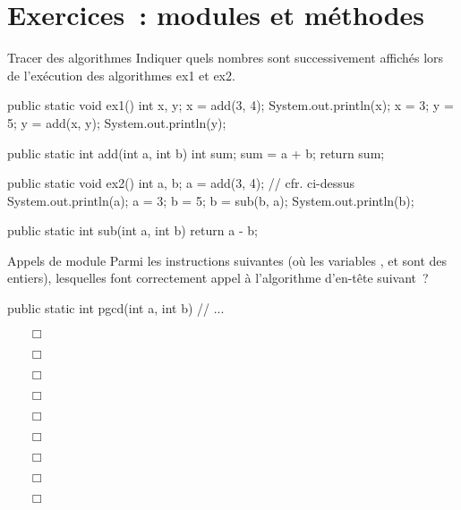 \clearpage
\section{Exercices~: modules et méthodes}

		\begin{Exercice}{Tracer des algorithmes}
			Indiquer quels nombres sont successivement affichés 
			lors de l’exécution des algorithmes ex1 et ex2.

			\begin{java}
public static void ex1(){
	int x, y;
	x = add(3, 4);
	System.out.println(x);
	x = 3;
	y = 5;
	y = add(x, y);
	System.out.println(y);
}

public static int add(int a, int b){
	int sum;
	sum = a + b;
	return sum;
}
			\end{java}

			\begin{java}
public static void ex2(){
	int a, b;
	a = add(3, 4);		// cfr. ci-dessus
	System.out.println(a);
	a = 3;
	b = 5;
	b = sub(b, a);
	System.out.println(b);
}

public static int sub(int a, int b){
	return a - b;
}
			\end{java}

	\end{Exercice}

	\begin{Exercice}{Appels de module}
		Parmi les instructions suivantes (où les variables
		,  et 
		sont des entiers), lesquelles font correctement appel 
		à l’algorithme d’en-tête suivant~?

		\begin{java}
public static int pgcd(int a, int b){
	// ...
}
		\end{java}

		\begin{itemize}
			\item[$\Box$]  
			\item[$\Box$] 
			\item[$\Box$] 
			\item[$\Box$] 
			\item[$\Box$] 
			\item[$\Box$] 
			\item[$\Box$] 
			\item[$\Box$] 
			\item[$\Box$] 
		\end{itemize}

	\end{Exercice}

